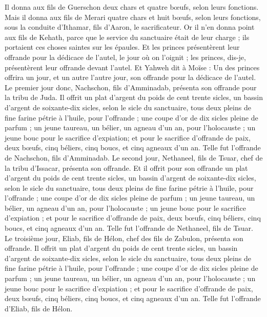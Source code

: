 \begin{multicols}{2}
Il donna aux fils de Guerschon deux chars et quatre bœufs, selon leurs fonctions.
Mais il donna aux fils de Merari quatre chars et huit bœufs, selon leurs fonctions, sous la conduite d'Ithamar, fils d'Aaron, le sacrificateur.
Or il n'en donna point aux fils de Kehath, parce que le service du sanctuaire était de leur charge ; ils portaient ces choses saintes sur les épaules.
Et les princes présentèrent leur offrande pour la dédicace de l'autel, le jour où on l'oignit ; les princes, dis-je, présentèrent leur offrande devant l'autel.
Et Yahweh dit à Moïse : Un des princes offrira un jour, et un autre l'autre jour, son offrande pour la dédicace de l'autel.
Le premier jour donc, Nachschon, fils d'Amminadab, présenta son offrande pour la tribu de Juda.
Il offrit un plat d'argent du poids de cent trente sicles, un bassin d'argent de soixante-dix sicles, selon le sicle du sanctuaire, tous deux pleins de fine farine pétrie à l'huile, pour l'offrande ;
une coupe d'or de dix sicles pleine de parfum ;
un jeune taureau, un bélier, un agneau d'un an, pour l'holocauste ;
un jeune bouc pour le sacrifice d'expiation;
et pour le sacrifice d'offrande de paix, deux bœufs, cinq béliers, cinq boucs, et cinq agneaux d'un an. Telle fut l'offrande de Nachschon, fils d'Amminadab.
Le second jour, Nethaneel, fils de Tsuar, chef de la tribu d'Issacar, présenta son offrande.
Et il offrit pour son offrande un plat d'argent du poids de cent trente sicles, un bassin d'argent de soixante-dix sicles, selon le sicle du sanctuaire, tous deux pleins de fine farine pétrie à l'huile, pour l'offrande ;
une coupe d'or de dix sicles pleine de parfum ;
un jeune taureau, un bélier, un agneau d'un an, pour l'holocauste ;
un jeune bouc pour le sacrifice d'expiation ;
et pour le sacrifice d'offrande de paix, deux bœufs, cinq béliers, cinq boucs, et cinq agneaux d'un an. Telle fut l'offrande de Nethaneel, fils de Tsuar.
Le troisième jour, Eliab, fils de Hélon, chef des fils de Zabulon, présenta son offrande.
Il offrit un plat d'argent du poids de cent trente sicles, un bassin d'argent de soixante-dix sicles, selon le sicle du sanctuaire, tous deux pleins de fine farine pétrie à l'huile, pour l'offrande ;
une coupe d'or de dix sicles pleine de parfum ;
un jeune taureau, un bélier, un agneau d'un an, pour l'holocauste ;
un jeune bouc pour le sacrifice d'expiation ;
et pour le sacrifice d'offrande de paix, deux bœufs, cinq béliers, cinq boucs, et cinq agneaux d'un an. Telle fut l'offrande d'Eliab, fils de Hélon.

\end{multicols}
